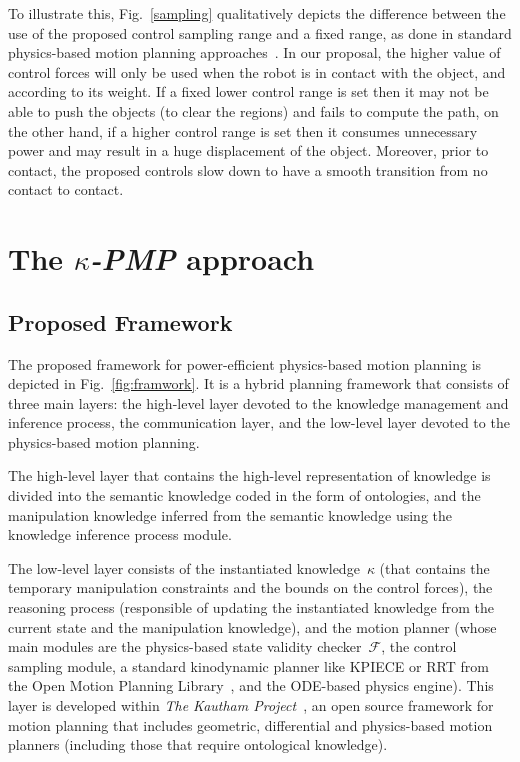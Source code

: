 \documentclass[twocolumn]{svjour3}          %
\begin{document}
To illustrate this, Fig.~\ref{sampling} qualitatively depicts the difference between the use of the proposed control sampling range and
 a fixed range, as done in standard physics-based motion planning approaches~\cite{muhayyuddin2015, sucan2012}. In our proposal, the higher value of control forces will only be used when the robot is in contact with the object, and according to its weight. If a fixed lower control range is set then it may not be able to push the objects (to clear the regions) and fails to compute the path, on the other hand, if a higher control range is set then it consumes unnecessary power and may result in a huge displacement of the object. Moreover, prior to contact, the proposed controls slow down to have a smooth transition from no contact to contact.


\section{ The \textit{$\kappa$-PMP} approach}\label{s-imlementation}
\subsection{Proposed Framework}\label{s-framework}


The proposed framework for power-efficient physics-based motion planning is depicted in Fig.~\ref{fig:framwork}. It is a hybrid planning framework that consists of three main layers: the high-level layer devoted to the knowledge management and inference process, the communication layer, and the low-level layer devoted to the physics-based motion planning.

The high-level layer that contains the high-level representation of knowledge is divided into the semantic knowledge coded in the form of ontologies, and the manipulation knowledge inferred from the semantic knowledge using the knowledge inference process module.

The low-level layer consists of the instantiated knowledge~$\kappa$ (that contains the temporary manipulation constraints and the bounds on the control forces), the reasoning process (responsible of updating the instantiated knowledge from the current state and the manipulation knowledge), and the motion planner (whose main modules are the physics-based state validity checker~$\mathcal{F}$, the control sampling module, a standard kinodynamic planner like KPIECE or RRT from the Open Motion Planning Library~\cite{sucanMK2012}, and the ODE-based physics engine). This layer is developed within \textit{The Kautham Project}~\cite{Rosell2014}, an open source framework for motion planning that includes geometric, differential and physics-based motion planners (including those that require ontological knowledge).
\end{document}
